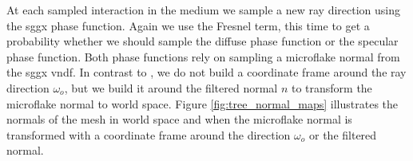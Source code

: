 At each sampled interaction in the medium we sample a new ray direction using the \ac{sggx} phase function.
Again we use the Fresnel term, this time to get a probability whether we should sample the diffuse phase function or the specular phase function.
Both phase functions rely on sampling a microflake normal from the \ac{sggx} \acl{vndf}.
In contrast to \citeauthor{sggx} \cite{sggx}, we do not build a coordinate frame around the ray direction $\omega_o$, but we build it around the filtered normal $n$ to transform the microflake normal to world space.
Figure \ref{fig:tree_normal_maps} illustrates the normals of the mesh in world space and when the microflake normal is transformed with a coordinate frame around the direction $\omega_o$ or the filtered normal.
